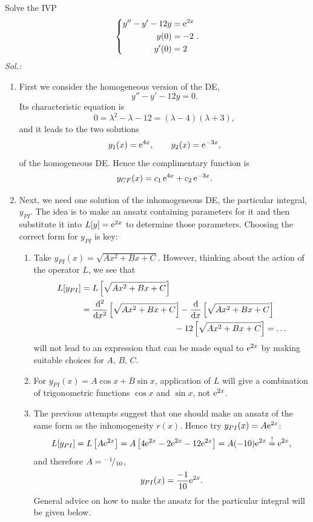 \begin{example}
Solve the IVP
\[ \left\{ \begin{split}
y''-y'-12y & = \mathrm{e}^{2x} \\ y(0) & = -2 \\ y'(0) & = 2
\end{split} \right. .\]
{\it Sol.:}
\begin{enumerate}[(1)]
	\item First we consider the homogeneous version of the DE,
	\[ y''-y'-12y = 0. \]
	Its characteristic equation is
	\[ 0 = \lambda^2-\lambda-12 = (\lambda-4)(\lambda+3), \]
	and it leads to the two solutions 
	\[ y_1(x) = \mathrm{e}^{4x}, \qquad y_2(x) = \mathrm{e}^{-3x}, \]
	of the homogeneous DE. Hence the complimentary function is
	\[ y_{CF}(x) = c_1 \, \mathrm{e}^{4x} + c_2 \, \mathrm{e}^{-3x}. \]
	\item Next, we need one solution of the inhomogeneous DE, the particular integral, $y_{PI}$. The idea is to make an ansatz containing parameters for it and then substitute it into $L[y]=\mathrm{e}^{2x}$ to determine those parameters. Choosing the correct form for $y_{PI}$ is key:
	\begin{enumerate}[{Attempt} 1:]
		\item Take $y_{PI}(x)=\sqrt{Ax^2+Bx+C}$. However, thinking about the action of the operator $L$, we see that 
		\[ \begin{split}
L[y_{PI}]&=L\left[\sqrt{Ax^2+Bx+C}\right] \\
&=\displaystyle{\frac{\mathrm{d}^2 }{\mathrm{d}x^2}}\left[\sqrt{Ax^2+Bx+C}\right]-\displaystyle{\frac{\mathrm{d}}{\mathrm{d}x}}\left[\sqrt{Ax^2+Bx+C}\right] \\
& \qquad \quad \qquad \qquad \qquad \qquad -12\left[\sqrt{Ax^2+Bx+C}\right] = \dots
		\end{split}  \]
		will not lead to an expression that can be made equal to $\mathrm{e}^{2x}$ by making suitable choices for $A,\,B,\,C$.
		\item For $y_{PI}(x) = A\cos x +B\sin x$, application of $L$ will give a combination of trigonometric functions $\cos x$ and $\sin x$, not $\mathrm{e}^{2x}$.
		\item The previous attempts suggest that one should make an ansatz of the same form as the inhomogeneity $r(x)$. Hence try $y_{PI}(x) = A\mathrm{e}^{2x}$:
		\[ L[y_{PI}]=L\left[ A\mathrm{e}^{2x} \right] 
		= A \left[ 4 \mathrm{e}^{2x} - 2 \mathrm{e}^{2x} - 12 \mathrm{e}^{2x} \right] 
		= A (-10) \mathrm{e}^{2x} \stackrel{!}{=}\mathrm{e}^{2x},\]
		and therefore $A={}^{-1}\!/_{10}$,
		\[ y_{PI}(x) = \frac{-1}{10}\mathrm{e}^{2x}. \]
		General advice on how to make the ansatz for the particular integral will be given below.
	\end{enumerate}

\end{enumerate}
\end{example}
